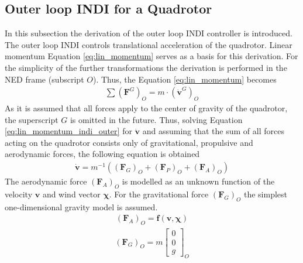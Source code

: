 \documentclass[11pt, a4paper, twoside]{report}
\begin{document}
\subsection{Outer loop INDI for a Quadrotor} \label{subsec: indi_outer}

In this subsection the derivation of the outer loop \acrshort{INDI} controller is introduced. The outer loop \acrshort{INDI} controls translational acceleration of the quadrotor. Linear momentum Equation \ref{eq:lin_momentum} serves as a basis for this derivation. For the simplicity of the further transformations the derivation is performed in the \acrshort{NED} frame (subscript $O$). Thus, the Equation \ref{eq:lin_momentum} becomes
\begin{equation}
	\begin{split}
		\sum (\bm{F}^G)_O = m \cdot (\bm{\dot{v}}^G)_{O}
		\label{eq:lin_momentum_indi_outer}
	\end{split}
\end{equation}
As it is assumed that all forces apply to the center of gravity of the quadrotor, the superscript $G$ is omitted in the future. Thus, solving Equation \ref{eq:lin_momentum_indi_outer} for $\bm{\dot{v}}$ and assuming that the sum of all forces acting on the quadrotor consists only of gravitational, propulsive and aerodynamic forces, the following equation is obtained
\begin{equation}
	\begin{split}
		\bm{\dot{v}} = m^{-1} ((\bm{F}_G)_O + (\bm{F}_P)_O+ (\bm{F}_A)_O)
		\label{eq:lin_momentum_indi_outer_simple}
	\end{split}
\end{equation}
The aerodynamic force $(\bm{F}_A)_O$ is modelled as an unknown function of the velocity $\bm{v}$ and wind vector $\bm{\chi}$. For the gravitational force $(\bm{F}_G)_O$ the simplest one-dimensional gravity model is assumed.
\begin{equation}
	\begin{split}
		(\bm{F}_A)_O = \bm{f}(\bm{v}, \bm{\chi})
		\label{eq:Fa}
	\end{split}
\end{equation}
\begin{equation}
	\begin{split}
		(\bm{F}_G)_O = m 
		\begin{bmatrix}
			0\\
			0\\
			g
		\end{bmatrix}_O
		\label{eq:Fg}
	\end{split}
\end{equation}
\end{document}
